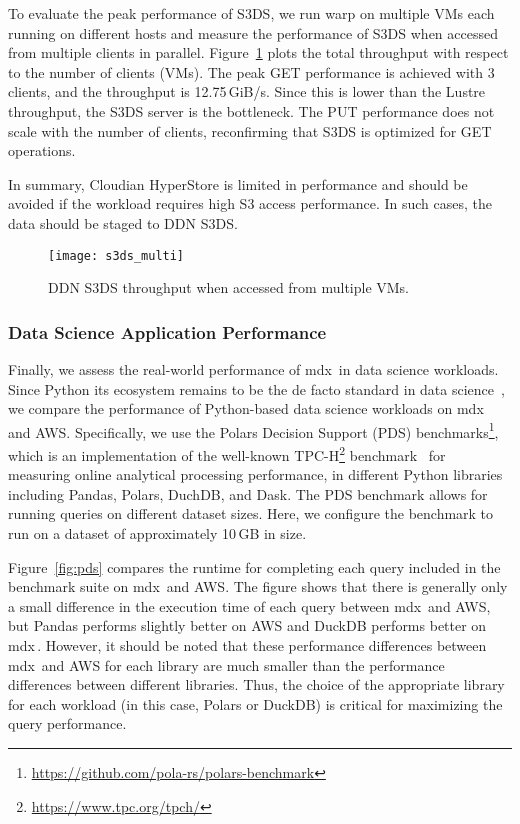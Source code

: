 \documentclass[a4paper,twoside]{article}
\newcommand{\mdx}{mdx\,\uppercase\expandafter{\romannumeral 2\relax}}
\begin{document}
To evaluate the peak performance of S3DS, we run warp on multiple VMs each running on different
hosts and measure the performance of S3DS when accessed from multiple clients in parallel.
Figure~\ref{fig:s3ds-multi} plots the total throughput with respect to the number of clients (VMs).
The peak GET performance is achieved with 3 clients, and the throughput is 12.75\,GiB/s.
Since this is lower than the Lustre throughput, the S3DS server is the bottleneck. The PUT
performance does not scale with the number of clients, reconfirming that S3DS is optimized for GET
operations.

In summary, Cloudian HyperStore is limited in performance and should be avoided if the workload
requires high S3 access performance. In such cases, the data should be staged to DDN S3DS.


\begin{figure}
    \centering
    \texttt{[image: s3ds\_multi]}%
    \caption{DDN S3DS throughput when accessed from multiple VMs.}\label{fig:s3ds-multi}
\end{figure}

\subsubsection{Data Science Application Performance}

Finally, we assess the real-world performance of \mdx{} in data science workloads.
Since Python its ecosystem remains to be the de facto standard in data
science~\cite{Castro2023,Raschka2020}, we compare the performance of Python-based data science
workloads on \mdx{} and AWS. Specifically, we use the Polars Decision Support (PDS)
benchmarks\footnote{\url{https://github.com/pola-rs/polars-benchmark}}, which is an implementation
of the well-known TPC-H\footnote{\url{https://www.tpc.org/tpch/}} benchmark~\cite{Dreseler2020}
for measuring online analytical processing performance, in different Python libraries
including Pandas, Polars, DuchDB, and Dask. The PDS benchmark allows for running queries on different
dataset sizes. Here, we configure the benchmark to run on a dataset of approximately 10\,GB in size.

Figure~\ref{fig:pds} compares the runtime for completing each query included in the benchmark suite
on \mdx{} and AWS. The figure shows that there is generally only a small difference in the execution
time of each query between \mdx{} and AWS, but Pandas performs slightly better on AWS and DuckDB
performs better on \mdx{}. However, it should be noted that these performance differences between
\mdx{} and AWS for each library are much smaller than the performance differences between different
libraries. Thus, the choice of the appropriate library for each workload (in this case, Polars or
DuckDB) is critical for maximizing the query performance.
\end{document}
